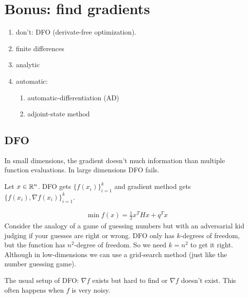 \documentclass[class=article,crop=false]{standalone}
\begin{document}
\section{Bonus: find gradients}

\begin{enumerate}[label=(\arabic*)]
	\item don't: DFO (derivate-free optimization). 	
	\item finite differences
	\item analytic
	\item automatic:
		\begin{enumerate}[label=(\alph*)]
			\item automatic-differentiation (AD)
			\item adjoint-state method
		\end{enumerate}	 
\end{enumerate}

\subsection{DFO}

In small dimensions, the gradient doesn't much information than multiple function evaluations. In large dimensions DFO fails.

Let $ x \in \mathbb{R}^{n}$. DFO gets $ \{f(x_i)\}_{i=1}^k$ and gradient method gets $ \{f(x_i), \nabla f(x_i)\}_{i=1}^k $. 

\begin{eg}
\begin{align*}
	\min f(x) = \frac{1}{2} x^{T} H x + q^{T} x
\end{align*}
Consider the analogy of a game of guessing numbers but with an adversarial kid judging if your guesses are right or wrong. DFO only has $ k$-degrees of freedom, but the function has  $ n^2$-degree of freedom. So we need $ k =n^2$ to get it right. Although in low-dimensions we can use a grid-search method (just like the number guessing game).

\end{eg}
The usual setup of DFO: $ \nabla f$ exists but hard to find or $ \nabla f$ doesn't exist. This often happens when $ f$ is very noisy.
\end{document}
